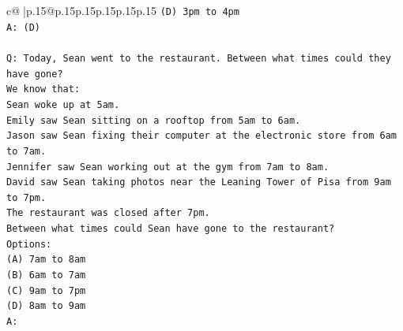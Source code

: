 \documentclass{article}
\begin{document}
{\begin{supertabular}{c@{$\;$}|p{.15\linewidth}@{}p{.15\linewidth}p{.15\linewidth}p{.15\linewidth}p{.15\linewidth}p{.15\linewidth}}
{{{\texttt{(D) 3pm to 4pm} \\
\texttt{A: (D)} \\
\\ 
\texttt{Q: Today, Sean went to the restaurant. Between what times could they have gone?} \\
\texttt{We know that:} \\
\texttt{Sean woke up at 5am.} \\
\texttt{Emily saw Sean sitting on a rooftop from 5am to 6am.} \\
\texttt{Jason saw Sean fixing their computer at the electronic store from 6am to 7am.} \\
\texttt{Jennifer saw Sean working out at the gym from 7am to 8am.} \\
\texttt{David saw Sean taking photos near the Leaning Tower of Pisa from 9am to 7pm.} \\
\texttt{The restaurant was closed after 7pm.} \\
\texttt{Between what times could Sean have gone to the restaurant?} \\
\texttt{Options:} \\
\texttt{(A) 7am to 8am} \\
\texttt{(B) 6am to 7am} \\
\texttt{(C) 9am to 7pm} \\
\texttt{(D) 8am to 9am} \\
\texttt{A:} \\
            }
        }
    }
     \\ \\


\end{supertabular}}
\end{document}
